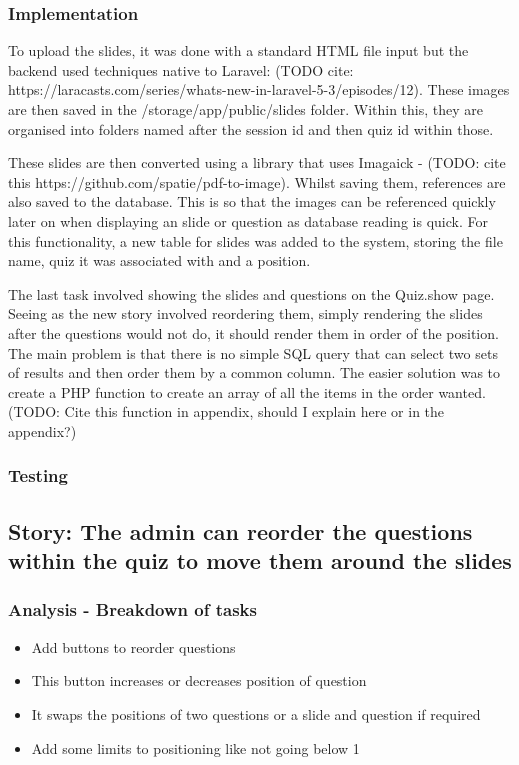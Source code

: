 \subsubsection{Implementation}
To upload the slides, it was done with a standard HTML file input but the backend used techniques native to Laravel: (TODO cite: https://laracasts.com/series/whats-new-in-laravel-5-3/episodes/12). These images are then saved in the /storage/app/public/slides folder. Within this, they are organised into folders named after the session id and then quiz id within those.

These slides are then converted using a library that uses Imagaick - (TODO: cite this https://github.com/spatie/pdf-to-image). Whilst saving them, references are also saved to the database. This is so that the images can be referenced quickly later on when displaying an slide or question as database reading is quick. For this functionality, a new table for slides was added to the system, storing the file name, quiz it was associated with and a position. 

The last task involved showing the slides and questions on the Quiz.show page. Seeing as the new story involved reordering them, simply rendering the slides after the questions would not do, it should render them in order of the position. The main problem is that there is no simple SQL query that can select two sets of results and then order them by a common column. The easier solution was to create a PHP function to create an array of all the items in the order wanted. (TODO: Cite this function in appendix, should I explain here or in the appendix?)
\subsubsection{Testing}
\newpage

\subsection{Story: The admin can reorder the questions within the quiz to move them around the slides}
\subsubsection{Analysis - Breakdown of tasks}
\begin{itemize}
	\item Add buttons to reorder questions
	\item This button increases or decreases position of question
	\item It swaps the positions of two questions or a slide and question if required
	\item Add some limits to positioning like not going below 1
\end{itemize}

